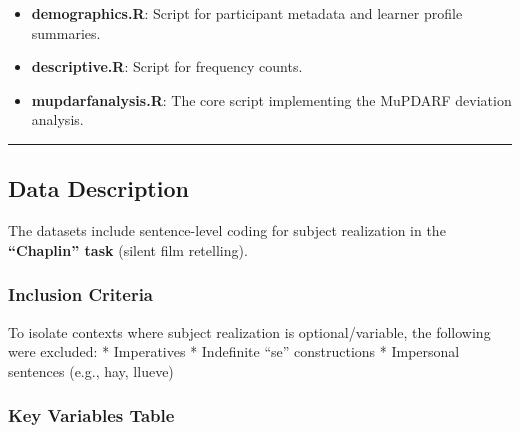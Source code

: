 \documentclass[
  letterpaper,
  DIV=11,
  numbers=noendperiod]{scrartcl}
\providecommand{\tightlist}{%
  \setlength{\itemsep}{0pt}\setlength{\parskip}{0pt}}
\begin{document}
\begin{itemize}
\tightlist
\item
  \textbf{demographics.R}: Script for participant metadata and learner
  profile summaries.
\item
  \textbf{descriptive.R}: Script for frequency counts.
\item
  \textbf{mupdarfanalysis.R}: The core script implementing the MuPDARF
  deviation analysis.
\end{itemize}

\begin{center}\rule{0.5\linewidth}{0.5pt}\end{center}

\subsection{Data Description}\label{data-description}

The datasets include sentence-level coding for subject realization in
the \textbf{``Chaplin'' task} (silent film retelling).

\subsubsection{Inclusion Criteria}\label{inclusion-criteria}

To isolate contexts where subject realization is optional/variable, the
following were excluded: * Imperatives * Indefinite ``se'' constructions
* Impersonal sentences (e.g., hay, llueve)

\subsubsection{Key Variables Table}\label{key-variables-table}
\end{document}
